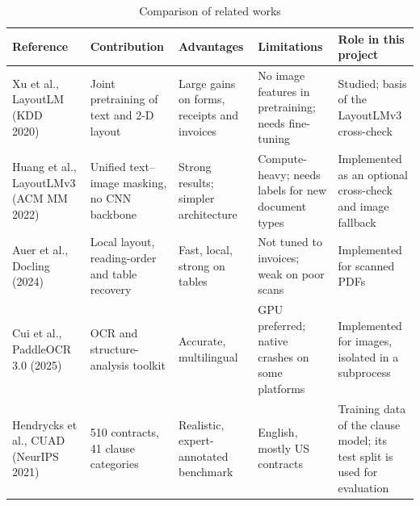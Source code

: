 \begin{table}[!htbp]
\centering\tablestyle
\caption{Comparison of related works}\label{tab:related}
\begin{tabularx}{\textwidth}{|L{0.16\textwidth}|L{0.18\textwidth}|L{0.16\textwidth}|L{0.17\textwidth}|Y|}
\hline
\textbf{Reference} & \textbf{Contribution} & \textbf{Advantages} & \textbf{Limitations} & \textbf{Role in this project} \\ \hline
Xu et al., LayoutLM (KDD 2020)~\cite{xu2020layoutlm} & Joint pretraining of text and 2-D layout & Large gains on forms, receipts and invoices & No image features in pretraining; needs fine-tuning & Studied; basis of the LayoutLMv3 cross-check \\ \hline
Huang et al., LayoutLMv3 (ACM MM 2022)~\cite{huang2022layoutlmv3} & Unified text--image masking, no CNN backbone & Strong results; simpler architecture & Compute-heavy; needs labels for new document types & Implemented as an optional cross-check and image fallback \\ \hline
Auer et al., Docling (2024)~\cite{auer2024docling} & Local layout, reading-order and table recovery & Fast, local, strong on tables & Not tuned to invoices; weak on poor scans & Implemented for scanned PDFs \\ \hline
Cui et al., PaddleOCR 3.0 (2025)~\cite{cui2025paddleocr} & OCR and structure-analysis toolkit & Accurate, multilingual & GPU preferred; native crashes on some platforms & Implemented for images, isolated in a subprocess \\ \hline
Hendrycks et al., CUAD (NeurIPS 2021)~\cite{hendrycks2021cuad} & 510 contracts, 41 clause categories & Realistic, expert-annotated benchmark & English, mostly US contracts & Training data of the clause model; its test split is used for evaluation \\ \hline
\end{tabularx}
\end{table}

